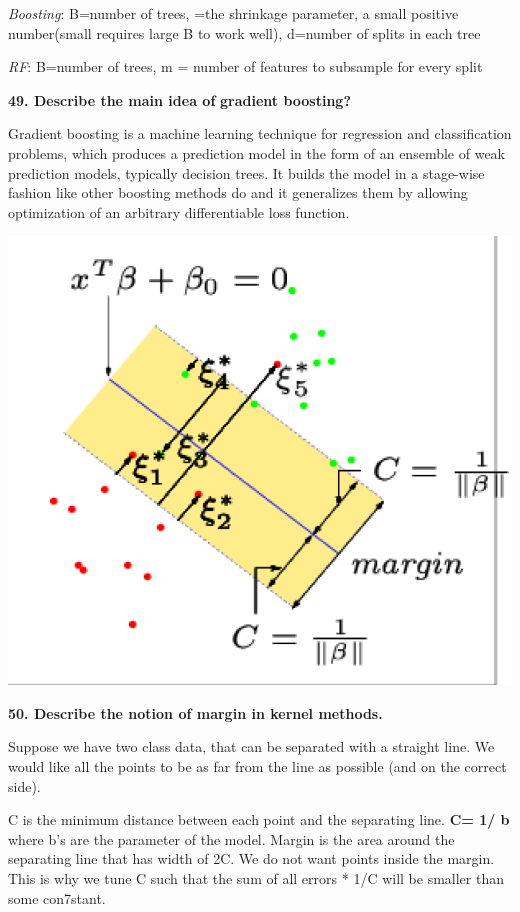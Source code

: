 \textit{Boosting}: B=number of trees, \textcrlambda=the shrinkage parameter, a
small positive number(small \textcrlambda requires large B to work well), d=number
of splits in each tree

\textit{RF}: B=number of trees, m = number of features to subsample
for every split

\textbf{49. Describe the main idea of} \textbf{gradient boosting?}

Gradient boosting is a machine learning technique for regression and
classification problems, which produces a prediction model in the form
of an ensemble of weak prediction models, typically decision trees. It
builds the model in a stage-wise fashion like other boosting methods do
and it generalizes them by allowing optimization of an arbitrary
differentiable loss function.

\includegraphics[width=\columnwidth]{media/image33.png}

\textbf{50. Describe the notion of margin in kernel methods.}

Suppose we have two class data, that can be separated with a straight
line. We would like all the points to be as far from the line as
possible (and on the correct side).

C is the minimum distance between each point and the separating line.
\textbf{C= 1/ \textbar b\textbar{}} where b's are the parameter of the
model. Margin is the area around the separating line that has width of
2C. We do not want points inside the margin. This is why we tune C such
that the sum of all errors * 1/C will be smaller than some con7stant.

